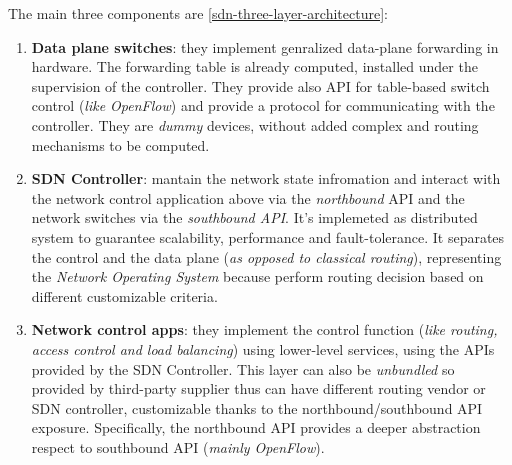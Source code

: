 \documentclass[10pt,a4paper]{report}
\theoremstyle{definition}
\begin{document}
The main three components are \ref{sdn-three-layer-architecture}:
\begin{enumerate}
	\item 
	\textbf{Data plane switches}: they implement genralized data-plane forwarding in hardware. The forwarding table is already computed, installed under the supervision of the controller. They provide also API for table-based switch control (\textit{like OpenFlow}) and provide a protocol for communicating with the controller. They are \textit{dummy} devices, without added complex and routing mechanisms to be computed.
	\item 
	\textbf{SDN Controller}: mantain the network state infromation and interact with the network control application above via the \textit{northbound} API and the network switches via the \textit{southbound API}. It's implemeted as distributed system to guarantee scalability, performance and fault-tolerance. It separates the control and the data plane (\textit{as opposed to classical routing}), representing the \textit{Network Operating System} because perform routing decision based on different customizable criteria.
	\item 
	\textbf{Network control apps}: they implement the control function (\textit{like routing, access control and load balancing}) using lower-level services, using the APIs provided by the SDN Controller. This layer can also be \textit{unbundled} so provided by third-party supplier thus can have different routing vendor or SDN controller, customizable thanks to the northbound/southbound API exposure. Specifically, the northbound API provides a deeper abstraction respect to southbound API (\textit{mainly OpenFlow}).
\end{enumerate}
\end{document}
